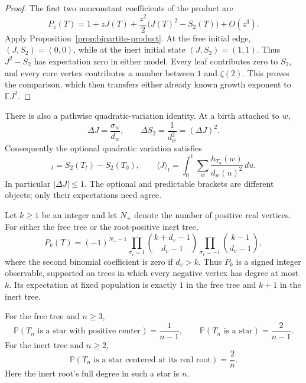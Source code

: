 \begin{proof}
The first two nonconstant coefficients of the product are
\[
 P_z(T)=1+zJ(T)+\frac{z^2}{2}\bigl(J(T)^2-S_2(T)\bigr)+O(z^3).
\]
Apply Proposition~\ref{prop:bipartite-product}.  At the free initial
edge, $(J,S_2)=(0,0)$, while at the inert initial state
$(J,S_2)=(1,1)$.  Thus $J^2-S_2$ has expectation zero in either model.
Every leaf contributes zero to $S_2$, and every core vertex contributes
a number between $1$ and $\zeta(2)$.  This proves the comparison, which
then transfers either already known growth exponent to $\mathbb EJ^2$.
\end{proof}

There is also a pathwise quadratic-variation identity.  At a birth
attached to $w$,
\[
 \Delta J=\frac{\sigma_w}{d_w},\qquad
 \Delta S_2=\frac1{d_w^2}=(\Delta J)^2.
\]
Consequently the optional quadratic variation satisfies
\begin{equation}
 [J]_t=S_2(T_t)-S_2(T_0),
 \qquad
 \langle J\rangle_t=\int_0^t\sum_w\frac{h_{T_u}(w)}{d_w(u)^2}\,du.
 \label{eq:bipartite-brackets}
\end{equation}
In particular $|\Delta J|\le1$.  The optional and predictable brackets
are different objects; only their expectations need agree.

\begin{proposition}
\label{prop:bipartite-integer}
Let $k\ge1$ be an integer and let $N_+$ denote the number of positive
real vertices.  For either the free tree or the root-positive inert
tree,
\begin{equation}
 P_k(T)=(-1)^{N_+-1}
   \prod_{\sigma_v=1}{k+d_v-1\choose d_v-1}
   \prod_{\sigma_v=-1}{k-1\choose d_v-1},
 \label{eq:bipartite-binomial}
\end{equation}
where the second binomial coefficient is zero if $d_v>k$.
Thus $P_k$ is a signed integer observable, supported on trees in which
every negative vertex has degree at most $k$.  Its expectation at
fixed population is exactly $1$ in the free tree and $k+1$ in the inert
tree.

For the free tree and $n\ge3$,
\begin{equation}
 \mathbb P(T_n\text{ is a star with positive center})=\frac1{n-1},
 \qquad \mathbb P(T_n\text{ is a star})=\frac2{n-1}.
 \label{eq:bipartite-free-star}
\end{equation}
For the inert tree and $n\ge2$,
\begin{equation}
 \mathbb P(T_n\text{ is a star centered at its real root})=\frac2n.
 \label{eq:bipartite-inert-star}
\end{equation}
Here the inert root's full degree in such a star is $n$.
\end{proposition}

